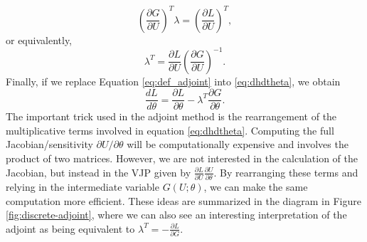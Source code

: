 \begin{equation}
    \left( \frac{\partial G}{\partial U}\right)^T \lambda 
    =  
    \left( \frac{\partial L}{\partial U} \right)^T,
    \label{eq:adjoint-state-equation}
\end{equation}
or equivalently,
\begin{equation}
    \lambda^T = \frac{\partial L}{\partial U} \left( \frac{\partial G}{\partial U} \right)^{-1}.
    \label{eq:def_adjoint}
\end{equation}
Finally, if we replace Equation \eqref{eq:def_adjoint} into \eqref{eq:dhdtheta}, we obtain 
\begin{equation}
    \frac{dL}{d\theta} 
    =
    \frac{\partial L}{\partial \theta} 
    - 
    \lambda^T \frac{\partial G}{\partial \theta}.
    \label{eq:gradient-adjoint-state-method}
\end{equation}
The important trick used in the adjoint method is the rearrangement of the multiplicative terms involved in equation \eqref{eq:dhdtheta}. 
Computing the full Jacobian/sensitivity $\partial U / \partial \theta$ will be computationally expensive and involves the product of two matrices. 
However, we are not interested in the calculation of the Jacobian, but instead in the VJP given by $\frac{\partial L}{\partial U} \frac{\partial U}{\partial \theta}$. 
By rearranging these terms and relying in the intermediate variable $G(U; \theta)$, we can make the same computation more efficient. 
These ideas are summarized in the diagram in Figure \ref{fig:discrete-adjoint}, where we can also see an interesting interpretation of the adjoint as being equivalent to $\lambda^T = - \frac{\partial L}{\partial G}$. 

